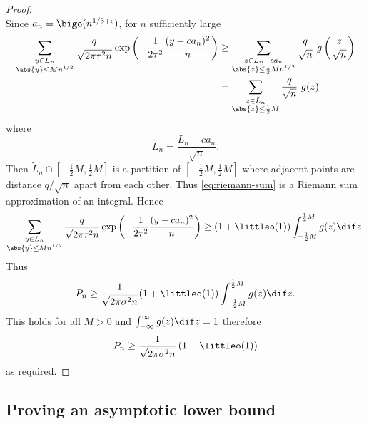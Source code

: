 \begin{proof}
\begin{equation*}
    \end{equation*}
    Since $a_n = \bigo(n^{1/3 + \epsilon})$, for $n$ sufficiently large
    \begin{align}
        \sum_{\substack{y \in L_n \\ \abs{y} \leq M n^{1/2}}}
        \frac{q}{\sqrt{2 \pi \tau^2 n}} \exp \left( - \frac{1}{2 \tau^2} \frac{(y - ca_n)^2}{n} \right)
        &\geq \sum_{\substack{z \in L_n - ca_n\\ \abs{z} \leq \frac{1}{2} M n^{1/2}}} 
        \frac{q}{\sqrt{n}}\ g \left( \frac{z}{\sqrt{n}} \right) \\
        &= \sum_{\substack{z \in \tilde{L}_n \\ \abs{z} \leq \frac{1}{2} M }}
        \frac{q}{\sqrt{n}}\ g(z) \label{eq:riemann-sum}
    \end{align}
    where
    \begin{equation*}
        \tilde{L}_n = \frac{L_n - ca_n}{\sqrt{n}}.
    \end{equation*}
    Then $\tilde{L}_n \cap [-\frac{1}{2}M, \frac{1}{2}M]$ is a partition of $[-\frac{1}{2}M, \frac{1}{2}M]$ where adjacent points are distance $q/\sqrt{n}$ apart from each other. Thus \cref{eq:riemann-sum} is a Riemann sum approximation of an integral. Hence
    \begin{equation*}
        \sum_{\substack{y \in L_n \\ \abs{y} \leq M n^{1/2}}}
        \frac{q}{\sqrt{2 \pi \tau^2 n}} \exp \left( - \frac{1}{2 \tau^2} \frac{(y - ca_n)^2}{n} \right)
        \geq (1 + \littleo(1)) \int_{-\frac{1}{2} M}^{\frac{1}{2}M} g(z) \dif z.
    \end{equation*}
    Thus
    \begin{equation*}
        P_n \geq \frac{1}{\sqrt{2 \pi \sigma^2 n}} (1 + \littleo(1)) \int_{-\frac{1}{2} M}^{\frac{1}{2}M} g(z) \dif z.
    \end{equation*}
    This holds for all $M > 0$ and $\int_{-\infty}^{\infty} g(z) \dif z = 1$ therefore 
    \begin{equation*}
        P_n \geq \frac{1}{\sqrt{2 \pi \sigma^2 n}} \left( 1 + \littleo(1) \right)
    \end{equation*}
    as required.
\end{proof}

\subsection{Proving an asymptotic lower bound}

